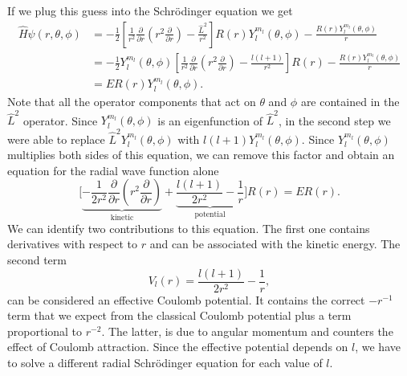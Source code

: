 \documentclass[../Main/chem331-notes.tex]{subfiles}
\begin{document}
If we plug this guess into the Schr\"{o}dinger equation we get
\begin{equation}
\begin{split}
\hat{H}\psi(r,\theta,\phi) & =  -\frac{1}{2} \left[ \frac{1}{r^2} \frac{\partial}{\partial r} \left( r^2 \frac{\partial }{\partial r} \right)
- \frac{\hat{L}^2}{r^2}  \right]R(r) Y_l^{m_l}(\theta,\phi)  - \frac{R(r) Y_l^{m_l}(\theta,\phi)}{r} \\
& = -\frac{1}{2} Y_l^{m_l}(\theta,\phi) \left[ \frac{1}{r^2} \frac{\partial}{\partial r} \left( r^2 \frac{\partial  }{\partial r} \right)
- \frac{l(l+1)}{r^2}  \right] R(r)  - \frac{R(r) Y_l^{m_l}(\theta,\phi)}{r} \\
& = E R(r) Y_l^{m_l}(\theta,\phi).
\end{split}
\end{equation}
Note that all the operator components that act on $\theta$ and $\phi$ are contained in the $\hat{L}^2$ operator. Since $Y_l^{m_l}(\theta,\phi)$ is an eigenfunction of $\hat{L}^2$, in the second step we were able to replace $\hat{L}^2Y_l^{m_l}(\theta,\phi)$ with $l(l+1)Y_l^{m_l}(\theta,\phi)$.
Since $Y_l^{m_l}(\theta,\phi)$ multiplies both sides of this equation, we can remove this factor and obtain an equation for the radial wave function alone
\begin{equation}
\Big[\underbrace{
 -\frac{1}{2r^2} \frac{\partial}{\partial r} \left( r^2 \frac{\partial  }{\partial r} \right)
 }_{\text{kinetic}}
+ \underbrace{
\frac{l(l+1)}{2r^2} - \frac{1}{r}
}_{\text{potential}}
\Big] R(r) = E R(r).
\end{equation}
We can identify two contributions to this equation. The first one contains derivatives with respect to $r$ and can be associated with the kinetic energy.
The second term
 \begin{equation}
V_l(r) = \frac{l(l+1)}{2r^2} - \frac{1}{r},
\end{equation}
can be considered an effective Coulomb potential. It contains the correct $- r^{-1}$ term that we expect from the classical Coulomb potential plus a term proportional to $r^{-2}$.
The latter, is due to angular momentum and counters the effect of Coulomb attraction.
Since the effective potential depends on $l$, we have to solve a different radial Schr\"{o}dinger equation for each value of $l$.
\end{document}

